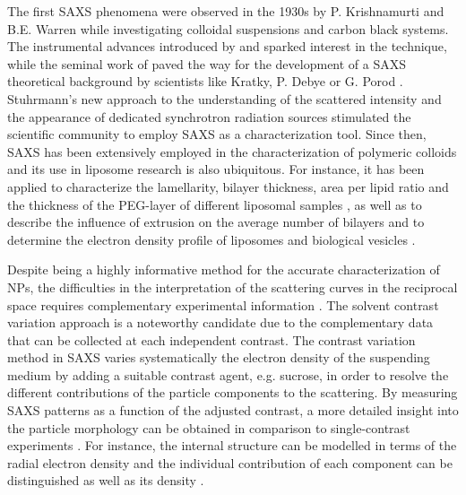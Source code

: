 The first SAXS phenomena were observed in the 1930s by P. Krishnamurti and B.E. Warren \citep{krishnamurti_studies_1930,krishnamurti_studies_1930-1, warren_xray_1934} while investigating colloidal suspensions and carbon black systems. The instrumental advances introduced by \cite{kratky_berechnung_1938} and \cite{guinier_dispositif_1937} sparked interest in the technique, while the seminal work of \cite{guinier_diffraction_1939} paved the way for the development of a SAXS theoretical background by scientists like Kratky, P. Debye or G. Porod \citep{kratky_bestimmung_1943,debye_scattering_1949,kratky_diffuse_1949,guinier_study_1950,guinier_small-angle_1955}. Stuhrmann's new approach to the understanding of the scattered intensity \citep{stuhrmann_elimination_1965} and the appearance of dedicated synchrotron radiation sources stimulated the scientific community to employ SAXS as a characterization tool. Since then, SAXS has been extensively employed in the characterization of polymeric colloids \citep{dingenouts_analysis_1999,chu_small-angle_2001,ballauff_analysis_2011} and its use in liposome research is also ubiquitous. For instance, it has been applied to characterize the lamellarity, bilayer thickness, area per lipid ratio \citep{pabst_applications_2010,bouwstra_small_1993,brzustowicz_x-ray_2005} and the thickness of the PEG-layer of different liposomal samples \citep{varga_closer_2010,varga_characterization_2012}, as well as to describe the influence of extrusion on the average number of bilayers \citep{jousma_characterization_1987} and to determine the electron density profile of liposomes \citep{bouwstra_small_1993,brzustowicz_x-ray_2005,hirai_determination_2003} and biological vesicles \citep{castorph_structure_2010}.

Despite being a highly informative method for the accurate characterization of NPs, the difficulties in the interpretation of the scattering curves in the reciprocal space requires complementary experimental information \citep{mykhaylyk_structural_2012}. The solvent contrast variation approach is a noteworthy candidate due to the complementary data that can be collected at each independent contrast. The contrast variation method in SAXS varies systematically the electron density of the suspending medium by adding a suitable contrast agent, e.g. sucrose, in order to resolve the different contributions of the particle components to the scattering. By measuring SAXS patterns as a function of the adjusted contrast, a more detailed insight into the particle morphology can be obtained in comparison to single-contrast experiments \citep{bolze_situ_2004}. For instance, the internal structure can be modelled in terms of the radial electron density \citep{dingenouts_radial_1994,dingenouts_analysis_1999,ballauff_analysis_2011,ballauff_small-angle_1996} and the individual contribution of each component can be distinguished \citep{beyer_saxs_1990,grunder_analysis_1991,grunder_small-angle_1993,ottewill_characterization_1995,bolze_small-angle_1997,dingenouts_structure_1994} as well as its density \citep{mykhaylyk_application_2007}.


